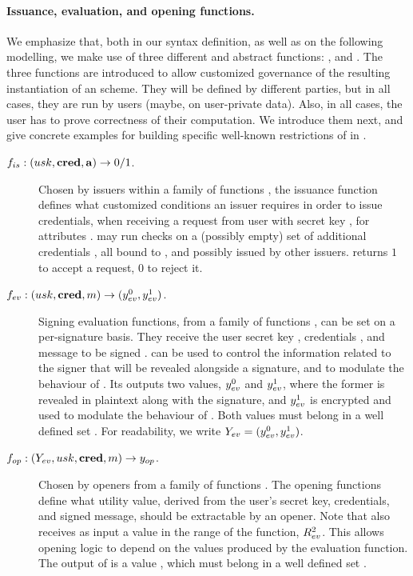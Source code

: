 \paragraph{Issuance, evaluation, and opening functions.} %
We emphasize that, both in our syntax definition, as well as on the following
modelling, we make use of three different and abstract functions: \fissue,
\feval and \finsp. The three functions are introduced to allow customized
governance of the resulting instantiation of an \UAS scheme. They will be
defined by different parties, but in all cases, they are run by users (maybe,
on user-private data). Also, in all cases, the user has to prove correctness of
their computation. We introduce them next, and give concrete examples for
building specific well-known restrictions of \UAS in
.

\begin{description}
\item[$f_{is}: (usk,\mathbf{cred},\mathbf{a})
  \rightarrow 0/1$.] Chosen by issuers within a family of functions \famfissue,
  the issuance function defines what customized conditions an issuer requires
  in order to issue credentials, when receiving a request from user with secret
  key \usk, for attributes \attrs. \fissue may run checks on a (possibly empty)
  set of additional credentials \scred, all bound to \usk, and possibly
  issued by other issuers. \fissue returns $1$ to accept a request, $0$ to
  reject it.
\item[$f_{ev}: (usk,\mathbf{cred},m)
  \rightarrow (y_{ev}^0,y_{ev}^1)$.] Signing evaluation functions, from a
  family of functions \famfeval, can be set on a per-signature basis. They
  receive the user secret key \usk, credentials \scred, and message to be signed
  \msg. \feval can be used to control the information related to the signer that
  will be revealed alongside a signature, and to modulate the behaviour of
  \finsp. Its outputs two values, $y_{ev}^0$ and $y_{ev}^1$, where the former
  is revealed in plaintext along with the signature, and $y_{ev}^1$ is encrypted
  and used to modulate the behaviour of \finsp. Both values must belong in a
  well defined set \rngfeval. For readability, we write
  $Y_{ev} = (y_{ev}^0,y_{ev}^1)$.
\item[$f_{op}: (Y_{ev},usk,\mathbf{cred},m) \rightarrow y_{op}$.]
  Chosen by openers from a family of functions \famfinsp. The opening
  functions define what utility value, derived from the user's secret key,
  credentials, and signed message, should be extractable by an opener.
  Note that \finsp also receives as input a value in the range of the \feval
  function, $R_{ev}^2$. This allows opening logic to depend on the values
  produced by the evaluation function. The output of \finsp is a value
  \yinsp, which must belong in a well defined set \rngfinsp.
\end{description}


